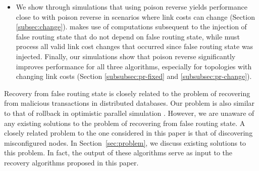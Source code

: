 \begin{itemize}
\item We show through simulations that \purge using poison reverse yields performance close to \cpr with poison reverse in scenarios where link costs can change
(Section \ref{subsec:change}). \purge makes use of computations subsequent to the injection of false routing state that do not depend on false routing state, while \cpr 
must process all valid link cost changes that occurred since false routing state was injected.  Finally, our simulations show that poison reverse significantly improves 
performance for all three algorithms, especially for topologies with changing link costs (Section \ref{subsubsec:pr-fixed} and \ref{subsubsec:pr-change}). %

\end{itemize}

Recovery from false routing state is closely related to the problem of
recovering from malicious transactions \cite{Liu98,Liu00} in
distributed databases. Our problem is also similar to that of rollback
in optimistic parallel simulation \cite{Jeff}. However, we are unaware
of any existing solutions to the problem of recovering from false
routing state. A closely related problem to the one considered in this
paper is that of discovering misconfigured nodes. In
Section~\ref{sec:problem}, we discuss existing solutions to this
problem. In fact, the output of these algorithms serve as input to the
recovery algorithms proposed in this paper.




